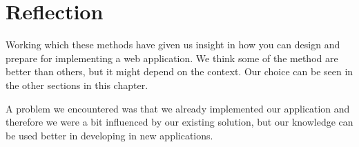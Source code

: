 \section{Reflection}
Working which these methods have given us insight in how you can design and prepare for implementing a web application. We think some of the method are better than others, but it might depend on the context. Our choice can be seen in the other sections in this chapter.

A problem we encountered was that we already implemented our application and therefore we were a bit influenced by our existing solution, but our knowledge can be used better in developing in new applications.